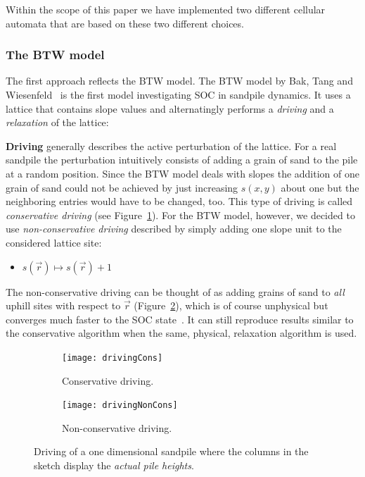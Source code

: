 Within the scope of this paper we have implemented two different cellular automata that are based on these two different
choices.

\subsubsection{The BTW model}
The first approach reflects the BTW model. The BTW model by Bak, Tang and Wiesenfeld~\cite{BakTangWiesenfeld:1987}
is the first model investigating SOC in sandpile dynamics. It uses a lattice that contains slope values and
alternatingly performs a \emph{driving} and a \emph{relaxation} of the lattice:

\textbf{Driving} generally describes the active perturbation of the lattice. For a real sandpile the perturbation
intuitively consists of adding a grain of sand to the pile at a random position. Since the BTW model deals with
slopes the addition of one grain of sand could not be achieved by just increasing $s(x,y)$ about one but the neighboring
entries would have to be changed, too. This type of driving is called \emph{conservative driving}
(see Figure~\ref{fig:driving:cons}).
For the BTW model, however, we decided to use \emph{non-conservative driving} described by simply adding one slope
unit to the considered lattice site:
\begin{itemize}
\item $s(\vec{r}) \mapsto s(\vec{r})+1$
\end{itemize}
The non-conservative driving can be thought of as adding grains of sand to \emph{all} uphill sites with respect to
$\vec{r}$ (Figure~\ref{fig:driving:non-cons}), which is of course unphysical but converges much faster to the
SOC state~\cite{Christensen1991}. It can still reproduce results similar to the conservative algorithm when the same,
physical, relaxation algorithm is used.

\begin{figure}[htb]
    \centering
    \begin{subfigure}{0.48\linewidth}
        \texttt{[image: drivingCons]}
        \caption{Conservative driving.}
        \label{fig:driving:cons}
    \end{subfigure}
    \begin{subfigure}{0.48\linewidth}
        \texttt{[image: drivingNonCons]}
        \caption{Non-conservative driving.}
        \label{fig:driving:non-cons}
    \end{subfigure}
    \caption{Driving of a one dimensional sandpile where the columns in the sketch display
             the \emph{actual pile heights}.}
    \label{fig:driving}
\end{figure}

